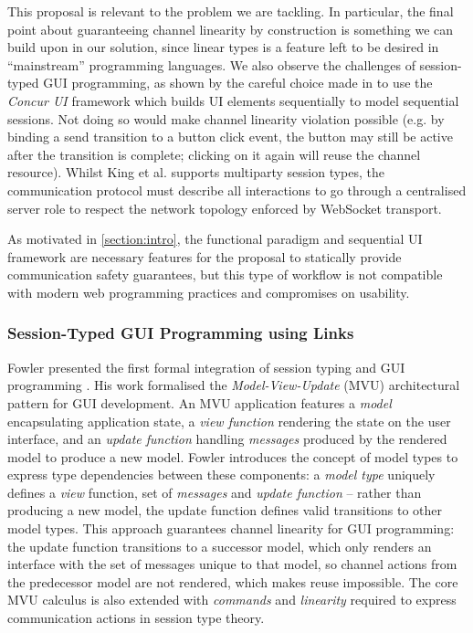 This proposal is relevant to the problem we are tackling.
In particular, the final point about guaranteeing channel linearity
by construction is something we can build upon in our solution,
since linear types is a feature left to be desired in
``mainstream'' programming languages.
We also observe the challenges of session-typed GUI
programming, as shown by the careful choice 
made in \cite{PureScript2019} 
to use the \textit{Concur UI} framework \cite{ConcurUI} which 
builds UI elements sequentially to model sequential sessions.
Not doing so would make channel linearity violation possible 
(e.g. by binding a send transition to a button click event,
the button may still be active after the transition is complete;
clicking on it again will reuse the channel resource).
Whilst King et al. \cite{PureScript2019} supports 
multiparty session types,
the communication protocol must describe all interactions
to go through a centralised server role to respect the
network topology enforced by WebSocket transport.

As motivated in \cref{section:intro}, 
the functional paradigm and sequential UI framework
are necessary features for the proposal to statically 
provide communication safety guarantees, but 
this type of workflow is not compatible with 
modern web programming practices and compromises on usability.

\subsubsection{Session-Typed GUI Programming 
using Links \cite{MVU2020}}
Fowler presented the first formal integration
of session typing and GUI programming .
His work formalised the \textit{Model-View-Update} (MVU)
architectural pattern for GUI development.
An MVU application features a \textit{model} encapsulating application
state, a \textit{view function} rendering the state on the 
user interface, and an
\textit{update function} handling
\textit{messages} produced by the
rendered model to produce a new model.
Fowler introduces the concept of model types
to express type dependencies between these components:
a \emph{model type} uniquely defines a \textit{view} function,
set of \textit{messages} and \textit{update function} --
rather than producing a new model, the update function 
defines valid transitions to other model types.
This approach guarantees channel linearity for GUI programming:
the update function transitions to a successor model, which only
renders an interface with the set of messages unique to that model,
so channel actions from the predecessor model are not rendered,
which makes reuse impossible.
The core MVU calculus is also extended with \textit{commands}
and \textit{linearity} required to express communication
actions in session type theory.


